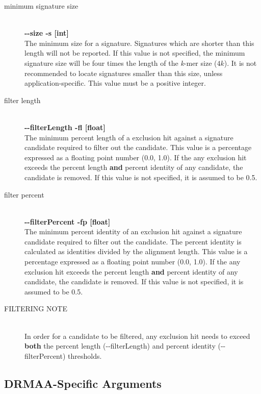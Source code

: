 \documentclass[a4paper,10pt]{article}
\begin{document}
\begin{description}
  \item[minimum signature size] \hfill \\
  \textbf{-{}-size -s [int]} \hfill \\
  The minimum size for a signature. Signatures which are shorter than this length will not be reported. If this value is not specified, the minimum signature size will be four times the length of the \textit{k}-mer size (\(4k\)). It is not recommended to locate signatures smaller than this size, unless application-specific. This value must be a positive integer.
  
  \item[filter length] \hfill \\
  \textbf{-{}-filterLength -fl [float]} \hfill \\
  The minimum percent length of a exclusion hit against a signature candidate required to filter out the candidate. This value is a percentage expressed as a floating point number (0.0, 1.0). If the any exclusion hit exceeds the percent length \textbf{and} percent identity of any candidate, the candidate is removed. If this value is not specified, it is assumed to be 0.5.
  
  \item[filter percent] \hfill \\
  \textbf{-{}-filterPercent -fp [float]} \hfill \\
  The minimum percent identity of an exclusion hit against a signature candidate required to filter out the candidate. The percent identity is calculated as identities divided by the alignment length. This value is a percentage expressed as a floating point number (0.0, 1.0). If the any exclusion hit exceeds the percent length \textbf{and} percent identity of any candidate, the candidate is removed. If this value is not specified, it is assumed to be 0.5. 
  
  \item[FILTERING NOTE] \hfill \\
  In order for a candidate to be filtered, any exclusion hit needs to exceed \textbf{both} the percent length (\mbox{-{}-filterLength}) and percent identity (\mbox{-{}-filterPercent}) thresholds.
  
\end{description}
  
\subsection{DRMAA-Specific Arguments}
\end{document}
